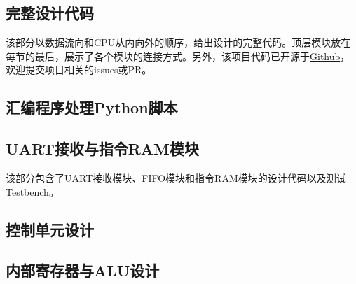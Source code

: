 \documentclass[lang=cn,a4paper,newtx]{elegantpaper}
\begin{document}
\begin{appendices}
  \section{完整设计代码}
  该部分以数据流向和CPU从内向外的顺序，给出设计的完整代码。顶层模块放在每节的最后，展示了各个模块的连接方式。另外，该项目代码已开源于\href{https://github.com/LiPtP0000/CPU_Design}{Github}，欢迎提交项目相关的issues或PR。
  \subsection{汇编程序处理Python脚本}\label{sec:appendices:python}
  
  \subsection{UART接收与指令RAM模块}\label{sec:appendices:uart}
  该部分包含了UART接收模块、FIFO模块和指令RAM模块的设计代码以及测试Testbench。
  
  
  
  
  
  
  
  \subsection{控制单元设计}\label{sec:appendices:control}
  
  
  
  
  \subsection{内部寄存器与ALU设计}\label{sec:appendices:alu}
  
  
  
  
  
  
  

\end{appendices}
\end{document}
